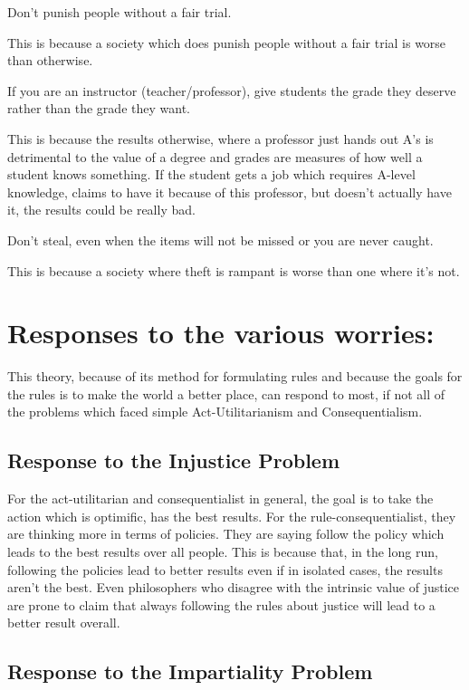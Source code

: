 \begin{center}
Don’t punish people without a fair trial. 
\end{center}
This is because a society which does punish people without a fair trial is worse than otherwise. 
\begin{center}
If you are an instructor (teacher/professor), give students the grade they deserve rather than the grade they want. 
\end{center}
This is because the results otherwise, where a professor just hands out A’s is detrimental to the value of a degree and grades are measures of how well a student knows something. If the student gets a job which requires A-level knowledge, claims to have it because of this professor, but doesn’t actually have it, the results could be really bad. 
\begin{center}
Don’t steal, even when the items will not be missed or you are never caught. 
\end{center}
This is because a society where theft is rampant is worse than one where it’s not.

\section{Responses to the various worries:}
This theory, because of its method for formulating rules and because the goals for the rules is to make the world a better place, can respond to most, if not all of the problems which faced simple Act-Utilitarianism and Consequentialism. 

\subsection{Response to the Injustice Problem}

For the act-utilitarian and consequentialist in general, the goal is to take the action which is optimific, has the best results. For the rule-consequentialist, they are thinking more in terms of policies. They are saying follow the policy which leads to the best results over all people. This is because that, in the long run, following the policies lead to better results even if in isolated cases, the results aren’t the best. Even philosophers who disagree with the intrinsic value of justice are prone to claim that always following the rules about justice will lead to a better result overall.

\subsection{Response to the Impartiality Problem}

